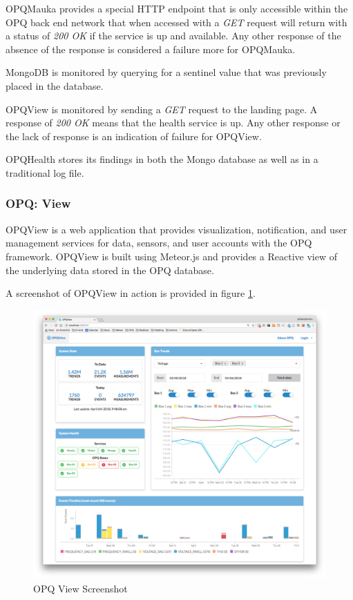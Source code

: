 OPQMauka provides a special HTTP endpoint that is only accessible within the OPQ back end network that when accessed with a \textit{GET} request will return with a status of \textit{200 OK} if the service is up and available. Any other response of the absence of the response is considered a failure more for OPQMauka.

MongoDB is monitored by querying for a sentinel value that was previously placed in the database.

OPQView is monitored by sending a \textit{GET} request to the landing page. A response of \textit{200 OK} means that the health service is up. Any other response or the lack of response is an indication of failure for OPQView.

OPQHealth stores its findings in both the Mongo database as well as in a traditional log file.

\subsubsection{OPQ: View}
OPQView is a web application that provides visualization, notification, and user management services for data, sensors, and user accounts with the OPQ framework. OPQView is built using Meteor.js and provides a Reactive view of the underlying data stored in the OPQ database.

A screenshot of OPQView in action is provided in figure \ref{fig:opq-view}.
	
\begin{figure}
	\centering
	\includegraphics[width=1\linewidth]{figures/opqview-landing-page.png}
	\caption{OPQ View Screenshot}\label{fig:opq-view}
\end{figure}

